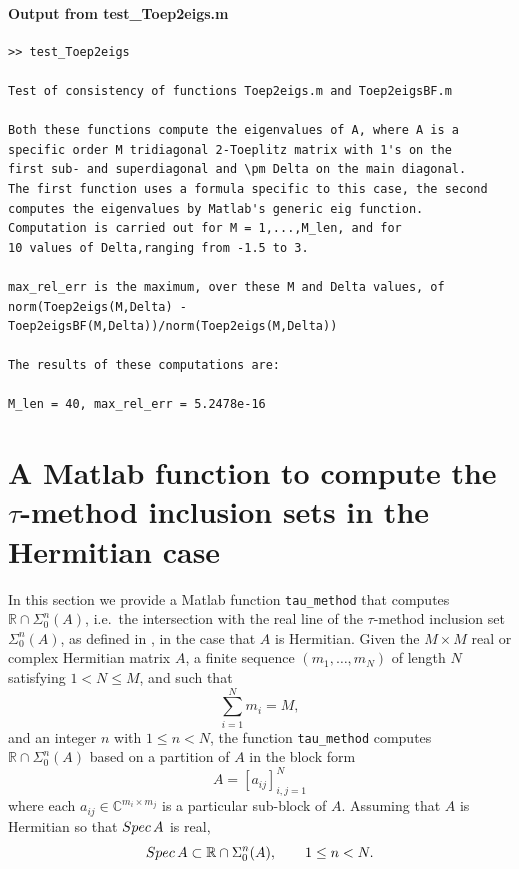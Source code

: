 \documentclass[preprint,1p,11pt]{elsarticle}
\newcommand\C{{\mathbb C}}
\newcommand\R{{\mathbb R}}
\newcommand\Spec{{\rm Spec}\,}  %
\numberwithin{equation}{section}   %
\numberwithin{figure}{section}  %
\begin{document}
\paragraph{Output from test\_Toep2eigs.m}
\begin{verbatim}
>> test_Toep2eigs
 
Test of consistency of functions Toep2eigs.m and Toep2eigsBF.m
 
Both these functions compute the eigenvalues of A, where A is a
specific order M tridiagonal 2-Toeplitz matrix with 1's on the
first sub- and superdiagonal and \pm Delta on the main diagonal.
The first function uses a formula specific to this case, the second
computes the eigenvalues by Matlab's generic eig function.
Computation is carried out for M = 1,...,M_len, and for
10 values of Delta,ranging from -1.5 to 3.
 
max_rel_err is the maximum, over these M and Delta values, of
norm(Toep2eigs(M,Delta) - Toep2eigsBF(M,Delta))/norm(Toep2eigs(M,Delta))
 
The results of these computations are:
 
M_len = 40, max_rel_err = 5.2478e-16
\end{verbatim}

\section{A Matlab function to compute the $\tau$-method inclusion sets in the Hermitian case} \label{sec:Herm}

In this section we provide a Matlab function \verb+tau_method+ that computes $\R\cap \Sigma_0^n(A)$, i.e.~the intersection with the real line of the $\tau$-method inclusion set $\Sigma_0^n(A)$, as defined in \cite[\S1.1]{CWL}, in the case that $A$ is Hermitian.  Given the $M\times M$ real or complex Hermitian matrix $A$, a finite sequence $(m_1,\ldots, m_N)$ of length $N$ satisfying $1<N\leq M$, and such that
\begin{equation} \label{eq:msum}
\sum_{i=1}^N m_i = M,
\end{equation}
and  an integer $n$ with $1\leq n< N$,
the function \verb+tau_method+ computes $\R\cap \Sigma_0^n(A)$ based on a partition of $A$ in the block form
\begin{equation} \label{eq:blocks}
A = [a_{ij}]_{i,j=1}^N
\end{equation}
where each $a_{ij}\in \C^{m_i \times m_j}$ is a particular sub-block of $A$. Assuming that $A$ is Hermitian so that $\Spec A$ is real,  
\begin{equation} \label{eq:incl}
\Spec A \subset \R\cap \Sigma_0^n(A), \qquad 1\leq n < N.
\end{equation} 
\end{document}
